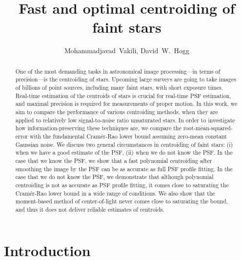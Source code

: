 \documentclass[12pt, preprint]{aastex}
\begin{document}
\author{
  Mohammadjavad~Vakili,
  David~W.~Hogg}

\title{Fast and optimal centroiding of faint stars}

\begin{abstract}
One of the most demanding tasks in astronomical image processing---in terms of precision---is the centroiding of stars. 
Upcoming large surveys are going to take images of billions of point sources, 
including many faint stars, with short exposure times. Real-time estimation of the
centroids of stars is crucial for real-time PSF estimation, and maximal precision is required
for measurements of proper motion. In this work, we aim to compare the performance of
various centroiding methods, when they are applied
to relatively low signal-to-noise ratio unsaturated stars.
In order to investigate how information-preserving these techniques are, we compare
the root-mean-squared-error with the fundamental Cram\'{e}r-Rao
lower bound assuming zero-mean constant Gaussian noise. We discuss two general circumstances in centroiding of faint stars: (i) when we have a good estimate
of the PSF, (ii) when we do not know the PSF. In the case that we know the PSF, 
we show that a fast polynomial centroiding after smoothing the image by the PSF can be 
as accurate as full PSF profile fitting. In the case that we do not
know the PSF, we demonstrate that although polynomial centroiding is not as
accurate as PSF profile fitting, it comes close to saturating the Cram\'{e}r-Rao lower bound
in a wide range of conditions. We also show that the moment-based method of center-of-light never comes close to 
saturating the bound, and thus it does not deliver reliable estimates of centroids.    
\end{abstract}


\section{Introduction}
\end{document}
